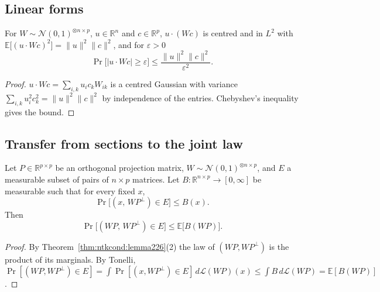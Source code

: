 \subsection{Linear forms}

\begin{lemma}\label{lem:ntkcond:linearForm}
  \leanok
For $W\sim\mathcal N(0,1)^{\otimes n\times p}$, $u\in\mathbb R^n$ and $c\in\mathbb R^p$, $u\cdot(Wc)$ is centred and in $L^2$ with $\mathbb E\bigl[(u\cdot Wc)^2\bigr]=\|u\|^2\|c\|^2$, and for $\varepsilon>0$
\[
  \Pr\bigl[|u\cdot Wc|\ge\varepsilon\bigr]\le\frac{\|u\|^2\|c\|^2}{\varepsilon^2}.
\]
\end{lemma}

\begin{proof}
  \leanok
$u\cdot Wc=\sum_{i,k}u_ic_kW_{ik}$ is a centred Gaussian with variance $\sum_{i,k}u_i^2c_k^2=\|u\|^2\|c\|^2$ by independence of the entries. Chebyshev's inequality gives the bound.
\end{proof}

\subsection{Transfer from sections to the joint law}

\begin{lemma}\label{lem:ntkcond:sectionTransfer}
  \leanok
Let $P\in\mathbb R^{p\times p}$ be an orthogonal projection matrix, $W\sim\mathcal N(0,1)^{\otimes n\times p}$, and $E$ a measurable subset of pairs of $n\times p$ matrices. Let $B:\mathbb R^{n\times p}\to[0,\infty]$ be measurable such that for every fixed $x$,
\[
  \Pr\bigl[(x,\,WP^\perp)\in E\bigr]\le B(x).
\]
Then
\[
  \Pr\bigl[(WP,\,WP^\perp)\in E\bigr]\le\mathbb E\bigl[B(WP)\bigr].
\]
\end{lemma}

\begin{proof}
  \leanok
By Theorem~\ref{thm:ntkcond:lemma226}(2) the law of $(WP,WP^\perp)$ is the product of its marginals. By Tonelli, $\Pr[(WP,WP^\perp)\in E]=\int\Pr[(x,WP^\perp)\in E]\,d\mathcal L(WP)(x)\le\int B\,d\mathcal L(WP)=\mathbb E[B(WP)]$.
\end{proof}


